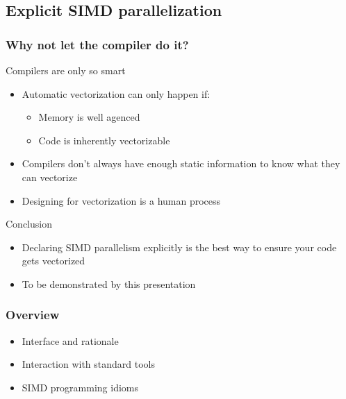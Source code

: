 \subsection{Explicit SIMD parallelization}
\frame
{
  \frametitle{Why not let the compiler do it?}
	
  \begin{block}{Compilers are only so smart}
  \footnotesize
   \begin{itemize}
		\footnotesize 
		\item Automatic vectorization can only happen if:
		\begin{itemize}
			\item Memory is well agenced
			\item Code is inherently vectorizable
		\end{itemize}
		\item Compilers don't always have enough static information to know what they can vectorize
		\item Designing for vectorization is a human process
	\end{itemize}
	\end{block}{}
	\begin{block}{Conclusion}
	\begin{itemize}
\footnotesize
		\item Declaring SIMD parallelism explicitly is the best way
              to ensure your code gets vectorized
        \item To be demonstrated by this presentation
    \end{itemize}
\end{block}{}
}

\begin{frame}
	\frametitle{Overview}	
	\begin{itemize}
		\item Interface and rationale
		\item Interaction with standard tools
		\item SIMD programming idioms
	\end{itemize}
\end{frame}
